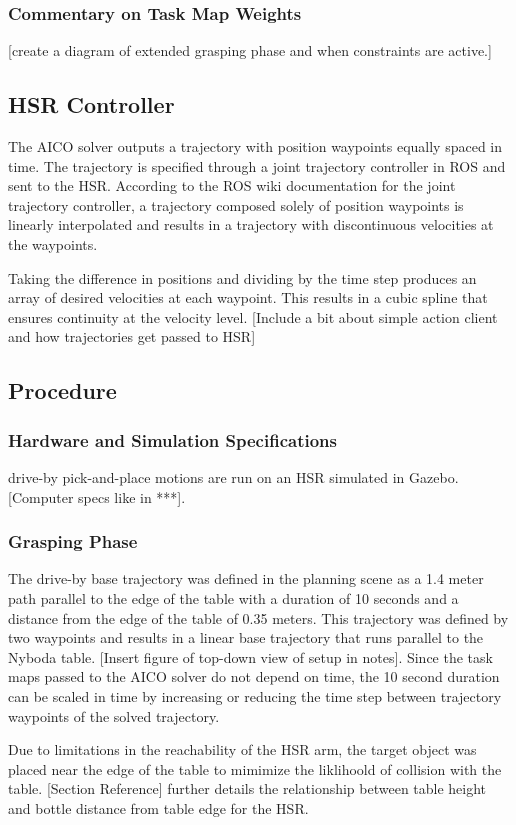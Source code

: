 \documentclass[12pt]{article}
\begin{document}
            \subsubsection{Commentary on Task Map Weights}
                [create a diagram of extended grasping phase and when constraints are active.]
        \subsection{HSR Controller}
            The AICO solver outputs a trajectory with position waypoints equally spaced in time. The trajectory is specified through a joint trajectory controller in ROS and sent to the HSR. According to the ROS wiki documentation for the joint trajectory controller, a trajectory composed solely of position waypoints is linearly interpolated and results in a trajectory with discontinuous velocities at the waypoints. 
            \par Taking the difference in positions and dividing by the time step produces an array of desired velocities at each waypoint. This results in a cubic spline that ensures continuity at the velocity level.
            [Include a bit about simple action client and how trajectories get passed to HSR]
        \subsection{Procedure}
            \subsubsection{Hardware and Simulation Specifications}
                drive-by pick-and-place motions are run on an HSR simulated in Gazebo. [Computer specs like in ***].
                
            \subsubsection{Grasping Phase}
                The drive-by base trajectory was defined in the planning scene as a 1.4 meter path parallel to the edge of the table with a duration of 10 seconds and a distance from the edge of the table of 0.35 meters. This trajectory was defined by two waypoints and results in a linear base trajectory that runs parallel to the Nyboda table. [Insert figure of top-down view of setup in notes]. Since the task maps passed to the AICO solver do not depend on time, the 10 second duration can be scaled in time by increasing or reducing the time step between trajectory waypoints of the solved trajectory.
                \par Due to limitations in the reachability of the HSR arm, the target object was placed near the edge of the table to mimimize the liklihoold of collision with the table. [Section Reference] further details the relationship between table height and bottle distance from table edge for the HSR.
\end{document}
